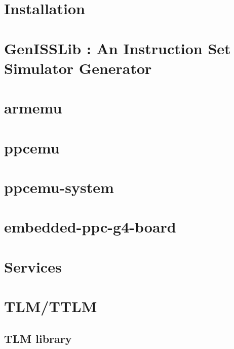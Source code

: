 \documentclass[a4paper,11pt,onecolumn]{mathese}
\begin{document}
\chapter{Installation}
\label{installation}


\chapter{GenISSLib : An Instruction Set Simulator Generator}
\label{genisslib}


\chapter{armemu}
\label{armemu}


\chapter{ppcemu}
\label{ppcemu}


\chapter{ppcemu-system}
\label{ppcemu_system}


\chapter{embedded-ppc-g4-board}
\label{embedded_ppc_g4_board}


\chapter{Services}
\label{services}


\chapter{TLM/TTLM}
\label{tlm_ttlm}


\begin{appendix}
\chapter{TLM library}
\label{tlm_appendix}


\end{appendix}

% 
%  

%
%
\end{document}
